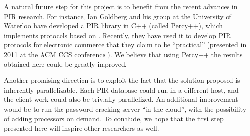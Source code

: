 \documentclass{llncs}
\begin{document}
A natural future step for this project is 
to benefit from the recent advances in PIR research.
For instance, Ian Goldberg and his group
at the University of Waterloo have developed a PIR library in C++
(called Percy++), which implements protocols based on \cite{Goldberg07}.
Recently, they have used it to develop
PIR protocols for electronic commerce that they claim to 
be ``practical'' (presented in 2011 at the ACM CCS conference
\cite{HenOluGol11}).
We believe that using Percy++ the results obtained here could
be greatly improved.

Another promising direction is to exploit the fact that
the solution proposed is inherently parallelizable. 
Each PIR database could run in a different host, 
and the client work could also be trivially parallelized.
An additional improvement would be to run the password cracking server ``in the cloud'',
with the possibility of adding processors on demand.
To conclude, we hope that the first step presented here will inspire other researchers as well.



{}

\end{document}

